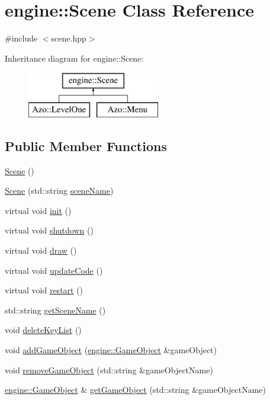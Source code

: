 \hypertarget{classengine_1_1_scene}{}\section{engine\+:\+:Scene Class Reference}
\label{classengine_1_1_scene}


{\ttfamily \#include $<$scene.\+hpp$>$}

Inheritance diagram for engine\+:\+:Scene\+:\begin{figure}[H]
\begin{center}
\leavevmode
\includegraphics[height=2.000000cm]{classengine_1_1_scene}
\end{center}
\end{figure}
\subsection*{Public Member Functions}
\begin{DoxyCompactItemize}
\item 
\hyperlink{classengine_1_1_scene_ad10176d75a9cc0da56626f682d083507}{Scene} ()
\item 
\hyperlink{classengine_1_1_scene_a06cf49594fe578fbcd662ab0e976cbd5}{Scene} (std\+::string \hyperlink{classengine_1_1_scene_a62943c09d12941bc32feab48e2d7d38a}{scene\+Name})
\item 
virtual void \hyperlink{classengine_1_1_scene_abb3b6efc6fdba03cd96436edaf08a967}{init} ()
\item 
virtual void \hyperlink{classengine_1_1_scene_afdc5c5539730b162ddb6fd99b0c0660c}{shutdown} ()
\item 
virtual void \hyperlink{classengine_1_1_scene_ac0e3d2c98ba6063a086467fb2c19142f}{draw} ()
\item 
virtual void \hyperlink{classengine_1_1_scene_ab8eb8334aee22d2797aedbacef9e3874}{update\+Code} ()
\item 
virtual void \hyperlink{classengine_1_1_scene_a279192188f7c239355209afd3e7c16ac}{restart} ()
\item 
std\+::string \hyperlink{classengine_1_1_scene_a4e9388d63f1576d127928a91d00fe8c8}{get\+Scene\+Name} ()
\item 
void \hyperlink{classengine_1_1_scene_a1035f4628a4878a0f1a7eb4082b83ded}{delete\+Key\+List} ()
\item 
void \hyperlink{classengine_1_1_scene_a2c1e265823a5e281e1970377674f0ff9}{add\+Game\+Object} (\hyperlink{classengine_1_1_game_object}{engine\+::\+Game\+Object} \&game\+Object)
\item 
void \hyperlink{classengine_1_1_scene_a02bb6e553349fe8a37f58cfe1bbc93cf}{remove\+Game\+Object} (std\+::string \&game\+Object\+Name)
\item 
\hyperlink{classengine_1_1_game_object}{engine\+::\+Game\+Object} \& \hyperlink{classengine_1_1_scene_af8eacc131836e089cd14f7b1ca88484c}{get\+Game\+Object} (std\+::string \&game\+Object\+Name)
\end{DoxyCompactItemize}
